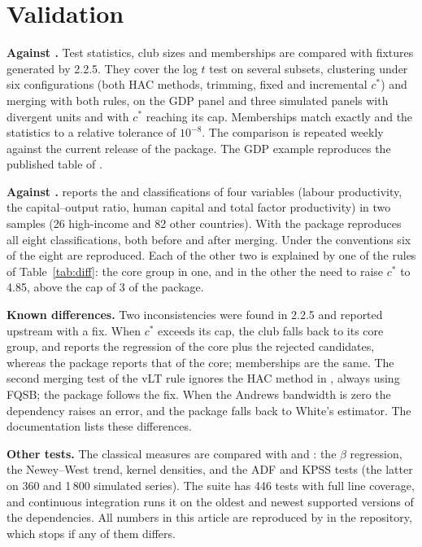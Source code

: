 \documentclass[article]{jss}
\begin{document}
\section{Validation} \label{sec:validation}

\textbf{Against .} Test statistics, club sizes and memberships are compared
with fixtures generated by  2.2.5. They cover the log $t$ test on
several subsets, clustering under six configurations (both HAC methods, trimming, fixed
and incremental $c^*$) and merging with both rules, on the GDP panel and three simulated
panels with divergent units and with $c^*$ reaching its cap. Memberships match exactly and
the statistics to a relative tolerance of $10^{-8}$. The comparison is repeated weekly
against the current release of the  package. The GDP example reproduces the
published table of \citet{SicheraPizzuto2019}.

\textbf{Against .} \citet{Mendez2020} reports the  and
 classifications of four variables (labour productivity, the
capital--output ratio, human capital and total factor productivity) in two samples (26
high-income and 82 other countries). With  the package
reproduces all eight classifications, both before and after merging. Under the
 conventions six of the eight are reproduced. Each of the other two is
explained by one of the rules of Table~\ref{tab:diff}: the core group in one, and in the
other the need to raise $c^*$ to 4.85, above the cap of 3 of the  package.

\textbf{Known differences.} Two inconsistencies were found in 
2.2.5 and reported upstream with a fix. When $c^*$ exceeds its cap, the club falls back to
its core group, and  reports the regression of the core plus the rejected
candidates, whereas the package reports that of the core; memberships are the same. The
second merging test of the vLT rule ignores the HAC method in , always using
FQSB; the package follows the fix. When the Andrews bandwidth is zero the 
dependency  raises an error, and the package falls back to White's
estimator. The documentation lists these differences.

\textbf{Other tests.} The classical measures are compared with  and
: the $\beta$ regression, the Newey--West trend, kernel densities, and the ADF and
KPSS tests (the latter on 360 and 1\,800 simulated series). The suite has 446 tests with
full line coverage, and continuous integration runs it on the oldest and newest supported
versions of the dependencies. All numbers in this article are reproduced by
 in the repository, which stops if any of them differs.
\end{document}
